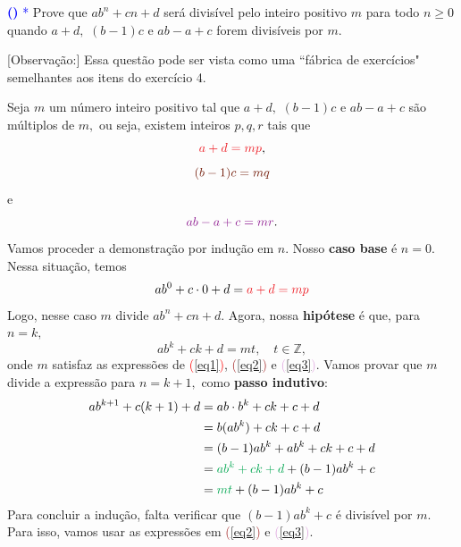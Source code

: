 \documentclass[12pt, a4paper]{article}
\newcounter{exercicio}[section]
\newenvironment{exercicio}[1][]{\refstepcounter{exercicio}\par\medskip
 \textcolor{blue}{\bf(\theexercicio)} \rmfamily}{\medskip }
\begin{document}
\begin{exercicio}\textcolor{Blue}{*}
Prove que $ab^n + cn + d$ será divisível pelo inteiro positivo $m$ para todo $n \ge 0$ quando $a + d,$ $(b-1)c$ e $ab - a + c$ forem divisíveis por $m.$


\textsf{[Observação:]} Essa questão pode ser vista como uma ``fábrica de exercícios" semelhantes aos itens do exercício 4. 
\end{exercicio}
\begin{solution}
Seja $m$ um número inteiro positivo tal que $a + d,$ $(b-1)c$ e $ab-a+c$ são múltiplos de $m,$ ou seja, existem inteiros $p, q, r$ tais que
\begin{equation}\label{eq1}
\textcolor{Red}{a + d = mp},
\end{equation}
\begin{equation}\label{eq2}
 \textcolor{Brown}{(b-1)c = mq}
\end{equation}
e
\begin{equation}\label{eq3}
 \textcolor{Plum}{ab - a + c = mr}.
\end{equation}
Vamos proceder a demonstração por indução em $n.$ Nosso \textbf{caso base} é $n = 0$. Nessa situação, temos
\[
ab^0 + c \cdot 0 + d = \textcolor{Red}{a + d = mp}
\]
Logo, nesse caso $m$ divide $ab^n + cn + d.$ Agora, nossa \textbf{hipótese} é que, para $n = k,$ 
\[
ab^k + ck + d = mt, \quad t \in \mathbb{Z},
\]
onde $m$ satisfaz as expressões de \textcolor{Red}{(\ref{eq1})}, \textcolor{Brown}{(\ref{eq2})} e \textcolor{Plum}{(\ref{eq3})}.
Vamos provar que $m$ divide a expressão para $n = k +1,$ como \textbf{passo indutivo}:
\begin{align*}
    ab^{k+1} + c(k+1) + d &= ab \cdot b^k + ck + c + d \\&= b(ab^k) + ck + c + d \\&= (b-1)ab^k + ab^k + ck + c + d \\&= \textcolor{Green}{ab^k + ck + d} + (b-1)ab^k + c \\&= \textcolor{Green}{mt} + (b-1)ab^k + c
\end{align*}
Para concluir a indução, falta verificar que $(b-1)ab^k + c$ é divisível por $m.$ Para isso, vamos usar as expressões em \textcolor{Brown}{(\ref{eq2})} e \textcolor{Plum}{(\ref{eq3})}.


\end{solution}
\end{document}
